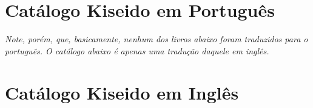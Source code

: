 \chapter{Catálogo Kiseido em Português}\label{ap:pt}

\emph{Note, porém, que, basicamente, nenhum dos livros abaixo foram traduzidos para o português. O catálogo abaixo é apenas uma tradução daquele em inglês.}

\bigskip

\chapter{Catálogo Kiseido em Inglês}\label{ap:en}